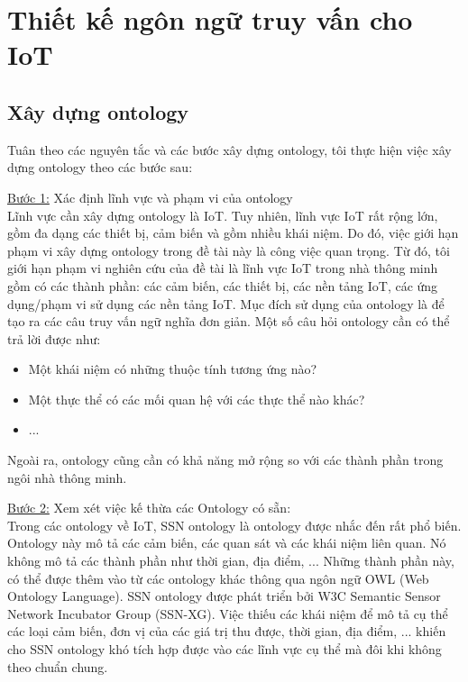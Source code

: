 \section{Thiết kế ngôn ngữ truy vấn cho IoT}

\subsection{Xây dựng ontology}
Tuân theo các nguyên tắc và các bước xây dựng ontology, tôi thực hiện việc xây dựng ontology theo các bước sau:

\underline{Bước 1:} Xác định lĩnh vực và phạm vi của ontology \\
Lĩnh vực cần xây dựng ontology là IoT. Tuy nhiên, lĩnh vực IoT rất rộng lớn, gồm đa dạng các thiết bị, cảm biến và gồm nhiều khái niệm. Do đó, việc giới hạn phạm vi xây dựng ontology trong đề tài này là công việc quan trọng. Từ đó, tôi giới hạn phạm vi nghiên cứu của đề tài là lĩnh vực IoT trong nhà thông minh gồm có các thành phần: các cảm biến, các thiết bị, các nền tảng IoT, các ứng dụng/phạm vi sử dụng các nền tảng IoT. 
Mục đích sử dụng của ontology là để tạo ra các câu truy vấn ngữ nghĩa đơn giản. Một số câu hỏi ontology cần có thể trả lời được như:
\begin{itemize}
	\item Một khái niệm có những thuộc tính tương ứng nào?
	\item Một thực thể có các mối quan hệ với các thực thể nào khác?
	\item ...
\end{itemize}
Ngoài ra, ontology cũng cần có khả năng mở rộng so với các thành phần trong ngôi nhà thông minh. 

\underline{Bước 2:} Xem xét việc kế thừa các Ontology có sẵn: \\
Trong các ontology về IoT, SSN ontology là ontology được nhắc đến rất phổ biến. Ontology này mô tả các cảm biến, các quan sát và các khái niệm liên quan. Nó không mô tả các thành phần như thời gian, địa điểm, ... Những thành phần này, có thể được thêm vào từ các ontology khác thông qua ngôn ngữ OWL (Web Ontology Language).
SSN ontology được phát triển bởi W3C Semantic Sensor Network Incubator Group (SSN-XG). Việc thiếu các khái niệm để mô tả cụ thể các loại cảm biến, đơn vị của các giá trị thu được, thời gian, địa điểm, ... khiến cho SSN ontology khó tích hợp được vào các lĩnh vực cụ thể mà đôi khi không theo chuẩn chung.

